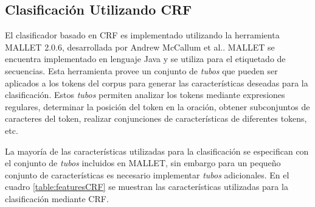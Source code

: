 \documentclass[runningheads,a4paper]{llncs}
\begin{document}
\subsection{Clasificación Utilizando CRF}

El clasificador basado en CRF es implementado  utilizando la herramienta MALLET 2.0.6, desarrollada por Andrew McCallum et al.\cite{MCCALLUM02}. MALLET se encuentra implementado en lenguaje Java y se utiliza para el etiquetado de secuencias. Esta herramienta provee un conjunto de \emph{tubos} que pueden ser aplicados a los tokens del corpus para generar las características deseadas para la clasificaci\'on. Estos \emph{tubos} permiten analizar los tokens mediante expresiones regulares, determinar la posición del token en la oración, obtener subconjuntos de caracteres del token, realizar conjunciones de características de diferentes tokens, etc.

La mayoría de las características utilizadas para la clasificación se especifican con el conjunto de \emph{tubos} incluidos en MALLET, sin embargo para un pequeño conjunto de características es necesario implementar \emph{tubos} adicionales. En el cuadro \ref{table:featuresCRF} se muestran las características utilizadas para la clasificación mediante CRF.
\end{document}
